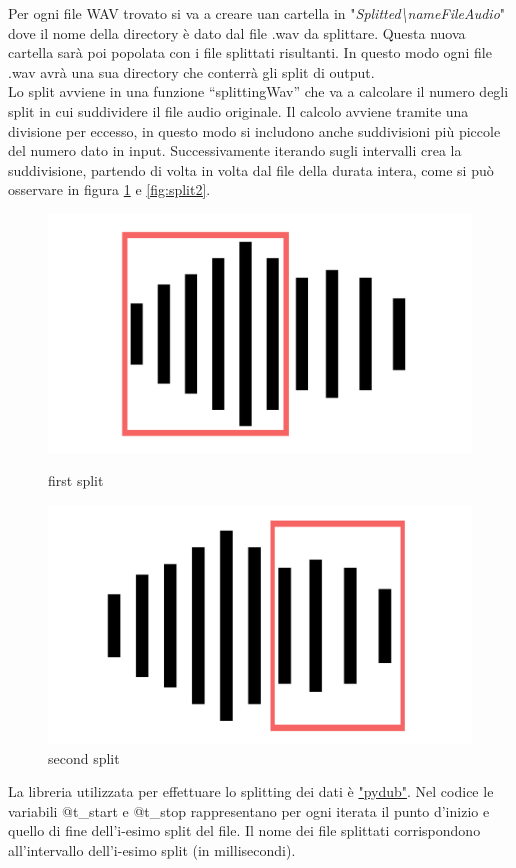 Per ogni file WAV trovato si va a creare uan cartella in "\textit{Splitted\textbackslash nameFileAudio}" dove il nome della directory è dato dal file .wav da splittare. Questa nuova cartella sarà poi popolata con i file splittati risultanti. In questo modo ogni file .wav avrà una sua directory che conterrà gli split di output.\\
Lo split avviene in una funzione “splittingWav” che va a calcolare il numero degli split in cui suddividere il file audio originale. Il calcolo avviene tramite una divisione per eccesso, in questo modo si includono anche suddivisioni più piccole del numero dato in input. Successivamente iterando sugli intervalli crea la suddivisione, partendo di volta in volta dal file della durata intera, come si può osservare in figura \ref{fig:split1} e \ref{fig:split2}.
\begin{figure}[h]
   \begin{minipage}{0.48\textwidth}
     \centering
     \includegraphics[width=0.85\linewidth]{imgs/capitolo4/suddivisione.png}
     \caption{first split}
         \label{fig:split2}
   \end{minipage}\hfill
   \begin{minipage}{0.48\textwidth}
     \centering
     \includegraphics[width=0.85\linewidth]{imgs/capitolo4/suddivisione2.png}
     \caption{second split}
     \label{fig:split1}
   \end{minipage}
   
\end{figure}
\FloatBarrier 
La libreria utilizzata per effettuare lo splitting dei dati è \href{https://github.com/jiaaro/pydub#installation}{"pydub"}\cite{pydub}. Nel codice le variabili @t\_start e @t\_stop rappresentano per ogni iterata il punto d'inizio e quello di fine dell'i-esimo split del file. Il nome dei file splittati corrispondono all’intervallo dell’i-esimo split (in millisecondi). 

